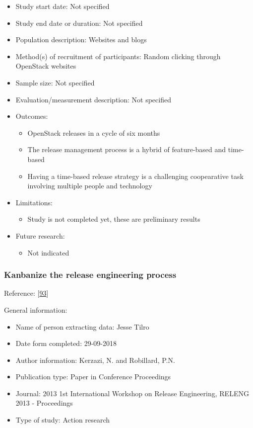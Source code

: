 \documentclass[]{book}
\providecommand{\tightlist}{%
  \setlength{\itemsep}{0pt}\setlength{\parskip}{0pt}}
\begin{document}
\begin{itemize}
\tightlist
\item
  Study start date: Not specified
\item
  Study end date or duration: Not specified
\item
  Population description: Websites and blogs
\item
  Method(s) of recruitment of participants: Random clicking through
  OpenStack websites
\item
  Sample size: Not specified
\item
  Evaluation/measurement description: Not specified
\item
  Outcomes:

  \begin{itemize}
  \tightlist
  \item
    OpenStack releases in a cycle of six months
  \item
    The release management process is a hybrid of feature-based and
    time-based
  \item
    Having a time-based release strategy is a challenging coopearative
    task involving multiple people and technology
  \end{itemize}
\item
  Limitations:

  \begin{itemize}
  \tightlist
  \item
    Study is not completed yet, these are preliminary results
  \end{itemize}
\item
  Future research:

  \begin{itemize}
  \tightlist
  \item
    Not indicated
  \end{itemize}
\end{itemize}

\subsubsection{Kanbanize the release engineering
process}\label{kanbanize-the-release-engineering-process}

Reference: {[}\protect\hyperlink{ref-kerzazi2013a}{93}{]}

General information:

\begin{itemize}
\tightlist
\item
  Name of person extracting data: Jesse Tilro
\item
  Date form completed: 29-09-2018
\item
  Author information: Kerzazi, N. and Robillard, P.N.
\item
  Publication type: Paper in Conference Proceedings
\item
  Journal: 2013 1st International Workshop on Release Engineering,
  RELENG 2013 - Proceedings
\item
  Type of study: Action research
\end{itemize}
\end{document}
